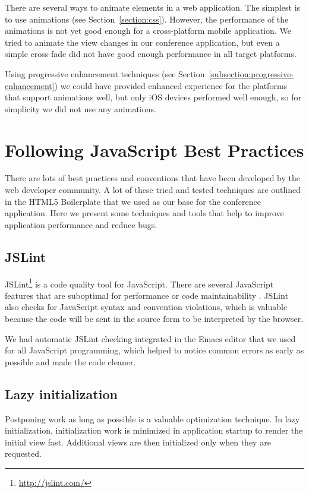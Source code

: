 There are several ways to animate elements in a web application. The
simplest is to use  animations (see
Section~\ref{section:css}). However, the performance of the animations
is not yet good enough for a cross-platform mobile application. We
tried to animate the view changes in our conference application, but
even a simple cross-fade did not have good enough performance in all
target platforms.

Using progressive enhancement techniques (see
Section~\ref{subsection:progressive-enhancement}) we could have
provided enhanced experience for the platforms that support animations
well, but only iOS devices performed well enough, so for simplicity we
did not use any animations.

\section{Following JavaScript Best Practices}
\label{section:js-best-practices}

There are lots of best practices and conventions that have been
developed by the web developer community. A lot of these tried and
tested techniques are outlined in the HTML5 Boilerplate
\citationneeded that we used as our base for the conference
application. Here we present some techniques and tools that help to
improve application performance and reduce bugs.

\subsection{JSLint}

JSLint\footnote{\url{http://jslint.com/}} is a code quality tool for
JavaScript. There are several JavaScript features that are suboptimal
for performance or code maintainability
\cite{crockford2008javascript}. JSLint also checks for JavaScript
syntax and convention violations, which is valuable because the code
will be sent in the source form to be interpreted by the browser.

We had automatic JSLint checking integrated in the Emacs
\citationneeded editor that we used for all JavaScript programming,
which helped to notice common errors as early as possible and made the
code cleaner.

\subsection{Lazy initialization}

Postponing work as long as possible is a valuable optimization
technique. In lazy initialization, initialization work is minimized in
application startup to render the initial view fast. Additional views
are then initialized only when they are requested.

